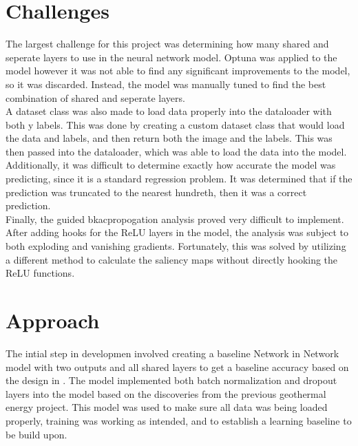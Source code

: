 \documentclass{article}[12pt]
\begin{document}
\section*{Challenges}

The largest challenge for this project was determining how many shared and seperate layers to use in the neural network model. Optuna was applied to the model however it was not able to find any significant improvements to the model, so it was discarded. Instead, the model was manually tuned to find the best combination of shared and seperate layers.\\
\indent
A dataset class was also made to load data properly into the dataloader with both y labels. This was done by creating a custom dataset class that would load the data and labels, and then return both the image and the labels. This was then passed into the dataloader, which was able to load the data into the model.\\
\indent
Additionally, it was difficult to determine exactly how accurate the model was predicting, since it is a standard regression problem. It was determined that if the prediction was truncated to the nearest hundreth, then it was a correct prediction.\\
\indent
Finally, the guided bkacpropogation analysis proved very difficult to implement. After adding hooks for the ReLU layers in the model, the analysis was subject to both exploding and vanishing gradients. Fortunately, this was solved by utilizing a different method to calculate the saliency maps without directly hooking the ReLU functions. \cite{saliency}

\section*{Approach}

The intial step in developmen involved creating a baseline Network in Network model with two outputs and all shared layers to get a baseline accuracy based on the design in \cite{d2l}. The model implemented both batch normalization and dropout layers into the model based on the discoveries from the previous geothermal energy project. This model was used to make sure all data was being loaded properly, training was working as intended, and to establish a learning baseline to be build upon.\\
\end{document}
